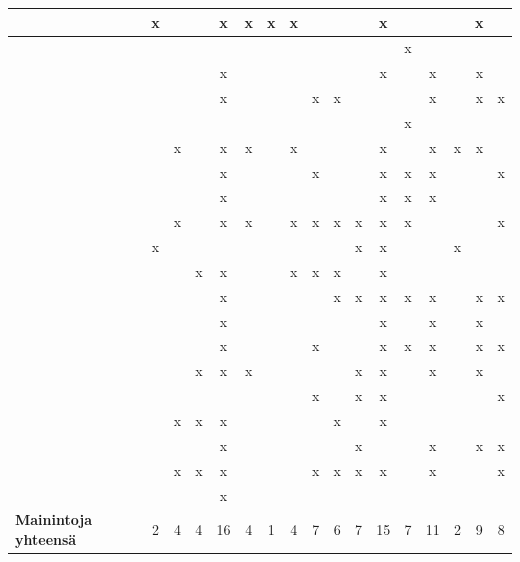 \documentclass[utf8]{gradu3}
\begin{document}
\begin{scriptsize}
\begin{longtable}[c]{| l | c | c | c | c | c | c | c | c | c | c | c | c | c | c | c | c |}
\textcite{rodeghero-ym-2021} & x &  &  & x & x & x & x &  &  &  & x &  &  &  & x &  \\
\hline
\textcite{azanza-ym-2021}    &  &  &  &  &  &  &  &  &  &  &  & x &  &  &  &  \\
\hline
\textcite{ju-ym-2021}        &  &  &  & x &  &  &  &  &  &  & x &  & x &  & x &  \\
\hline
\textcite{britto-ym-2020}    &  &  &  & x &  &  &  & x & x &  &  &  & x &  & x & x \\
\hline
\textcite{yates-ym-2020}     &  &  &  &  &  &  &  &  &  &  &  & x &  &  &  &  \\
\hline
\textcite{moe-ym-2020}       &  & x &  & x & x &  & x &  &  &  & x &  & x & x & x &  \\
\hline
\textcite{kumar-wallace-2019} &  &  &  & x &  &  &  & x &  &  & x & x & x &  &  & x \\
\hline
\textcite{viviani-murphy-2019} &  &  &  & x &  &  &  &  &  &  & x & x & x &  &  &  \\
\hline
\textcite{buchan-ym-2019} &  & x &  & x & x &  & x & x & x & x & x & x &  &  &  & x \\
\hline
\textcite{tuzun-ym-2018} & x &  &  &  &  &  &  &  &  & x & x &  &  & x &  &  \\
\hline
\textcite{matturro-ym-2017} &  &  & x & x &  &  & x & x & x &  & x &  &  &  &  &  \\
\hline
\textcite{britto-ym-2017} &  &  &  & x &  &  &  &  & x & x & x & x & x &  & x & x \\
\hline
\textcite{pham-ym-2017} &  &  &  & x &  &  &  &  &  &  & x &  & x &  & x &  \\
\hline
\textcite{kumar-ym-2016} &  &  &  & x &  &  &  & x &  &  & x & x & x &  & x & x \\
\hline
\textcite{shannon-pool-2016} &  &  & x & x & x &  &  &  &  & x & x &  & x &  & x &  \\
\hline
\textcite{viana-ym-2014} &  &  &  &  &  &  &  & x &  & x & x &  &  &  &  & x \\
\hline
\textcite{hemphill-begel-2011} &  & x & x & x &  &  &  &  & x &  & x &  &  &  &  &  \\
\hline
\textcite{kulkarni-ym-2010} &  &  &  & x &  &  &  &  &  & x &  &  & x &  & x & x \\
\hline
\textcite{johnson-senges-2010} &  & x & x & x &  &  &  & x & x & x & x &  & x &  &  & x \\
\hline
\textcite{bjornson-dingsøyr-2005} &  &  &  & x &  &  &  &  &  &  &  &  &  &  &  &  \\
\hline
\hline
\textbf{Mainintoja yhteensä} & 2 & 4 & 4 & 16 & 4 & 1 & 4 & 7 & 6 & 7 & 15 & 7 & 11 & 2 & 9 & 8 \\
 
\end{longtable}
\end{scriptsize}
\end{document}
